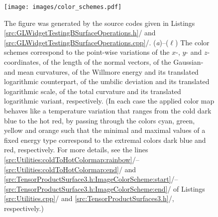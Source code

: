 \documentclass[b5paper, twosided]{book}
\DeclareRobustCommand{\mref}[1]{\ref{#1}{\relsize{-1}/\pageref{#1}}}
\begin{document}
\begin{figure}[!htb]
    \centering
    \texttt{[image: images/color\_schemes.pdf]}
    \caption{The figure was generated by the source codes given in Listings \mref{src:GLWidgetTestingBSurfaceOperations.h} and \mref{src:GLWidgetTestingBSurfaceOperations.cpp}. (\textit{a})--($\ell$) The color schemes correspond to the point-wise variations of the $x$-, $y$- and $z$-coordinates, of the length of the normal vectors, of the Gaussian- and mean curvatures, of the Willmore energy and its translated logarithmic counterpart, of the umbilic deviation and its translated logarithmic scale, of the total curvature and its translated logarithmic variant, respectively. (In each case the applied color map behaves like a temperature variation that ranges from the cold dark blue to the hot red, by passing through the colors cyan, green, yellow and orange such that the minimal and maximal values of a fixed energy type correspond to the extremal colors dark blue and red, respectively. For more details, see the lines  \mref{src:Utilities:coldToHotColormap:rainbow}--\mref{src:Utilities:coldToHotColormap:end} and \mref{src:TensorProductSurface3.h:ImageColorScheme:start}--\mref{src:TensorProductSurface3.h:ImageColorScheme:end} of Listings \mref{src:Utilities.cpp} and \mref{src:TensorProductSurfaces3.h}, respectively.)}
    \label{fig:color_schemes}
\end{figure}
\end{document}
